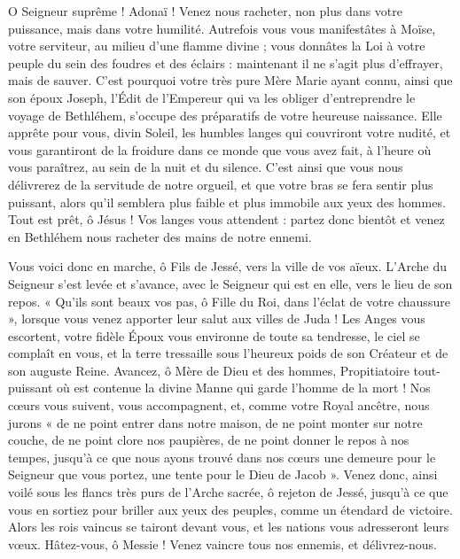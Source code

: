 \documentclass[%
fontsize=10%
,a6paper%
,DIV=15%
]{scrartcl}
\begin{document}
O Seigneur suprême ! Adonaï ! Venez nous racheter, non plus dans votre puissance, mais dans votre humilité. Autrefois vous vous manifestâtes à Moïse, votre serviteur, au milieu d’une flamme divine ; vous donnâtes la Loi à votre peuple du sein des foudres et des éclairs : maintenant il ne s’agit plus d’effrayer, mais de sauver. C’est pourquoi votre très pure Mère Marie ayant connu, ainsi que son époux Joseph, l’Édit de l’Empereur qui va les obliger d’entreprendre le voyage de Bethléhem, s’occupe des préparatifs de votre heureuse naissance. Elle apprête pour vous, divin Soleil, les humbles langes qui couvriront votre nudité, et vous garantiront de la froidure dans ce monde que vous avez fait, à l’heure où vous paraîtrez, au sein de la nuit et du silence. C’est ainsi que vous nous délivrerez de la servitude de notre orgueil, et que votre bras se fera sentir plus puissant, alors qu’il semblera plus faible et plus immobile aux yeux des hommes. Tout est prêt, ô Jésus ! Vos langes vous attendent : partez donc bientôt et venez en Bethléhem nous racheter des mains de notre ennemi.


Vous voici donc en marche, ô Fils de Jessé, vers la ville de vos aïeux. L’Arche du Seigneur s’est levée et s’avance, avec le Seigneur qui est en elle, vers le lieu de son repos. « Qu’ils sont beaux vos pas, ô Fille du Roi, dans l’éclat de votre chaussure », lorsque vous venez apporter leur salut aux villes de Juda ! Les Anges vous escortent, votre fidèle Époux vous environne de toute sa tendresse, le ciel se complaît en vous, et la terre tressaille sous l’heureux poids de son Créateur et de son auguste Reine. Avancez, ô Mère de Dieu et des hommes, Propitiatoire tout-puissant où est contenue la divine Manne qui garde l’homme de la mort ! Nos cœurs vous suivent, vous accompagnent, et, comme votre Royal ancêtre, nous jurons « de ne point entrer dans notre maison, de ne point monter sur notre couche, de ne point clore nos paupières, de ne point donner le repos à nos tempes, jusqu’à ce que nous ayons trouvé dans nos cœurs une demeure pour le Seigneur que vous portez, une tente pour le Dieu de Jacob ». Venez donc, ainsi voilé sous les flancs très purs de l’Arche sacrée, ô rejeton de Jessé, jusqu’à ce que vous en sortiez pour briller aux yeux des peuples, comme un étendard de victoire. Alors les rois vaincus se tairont devant vous, et les nations vous adresseront leurs vœux. Hâtez-vous, ô Messie ! Venez vaincre tous nos ennemis, et délivrez-nous.
\end{document}
